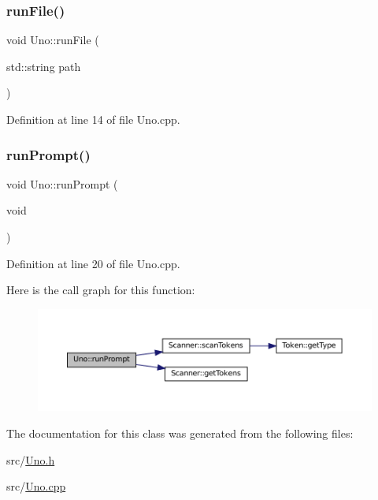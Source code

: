 \subsubsection{\texorpdfstring{run\+File()}{runFile()}}
{\footnotesize\ttfamily void Uno\+::run\+File (\begin{DoxyParamCaption}\item[{std\+::string}]{path }\end{DoxyParamCaption})}



Definition at line 14 of file Uno.\+cpp.

\mbox{\label{classUno_aa690e5403bb1d8a9d3af81b4fa664e1c}} 
\subsubsection{\texorpdfstring{run\+Prompt()}{runPrompt()}}
{\footnotesize\ttfamily void Uno\+::run\+Prompt (\begin{DoxyParamCaption}\item[{void}]{ }\end{DoxyParamCaption})}



Definition at line 20 of file Uno.\+cpp.

Here is the call graph for this function\+:
\nopagebreak
\begin{figure}[H]
\begin{center}
\leavevmode
\includegraphics[width=350pt]{classUno_aa690e5403bb1d8a9d3af81b4fa664e1c_cgraph}
\end{center}
\end{figure}


The documentation for this class was generated from the following files\+:\begin{DoxyCompactItemize}
\item 
src/\hyperlink{Uno_8h}{Uno.\+h}\item 
src/\hyperlink{Uno_8cpp}{Uno.\+cpp}\end{DoxyCompactItemize}
